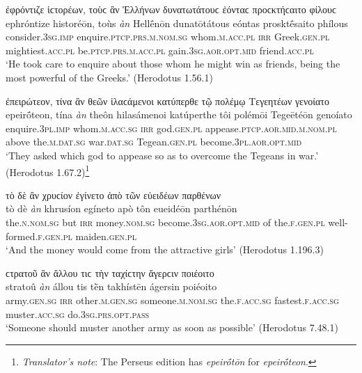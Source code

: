 \begin{exe}
\ex ἐφρόντιζε ἱϲτορέων, τοὺϲ ἂν Ἑλλήνων δυνατωτάτουϲ ἐόνταϲ προϲκτήϲαιτο φίλουϲ\\
\gll ephróntize historéōn, toùs \emph{àn} Hellḗnōn dunatōtátous eóntas prosktḗsaito phílous\\
consider.\textsc{3sg.imp} enquire.\textsc{ptcp.prs.m.nom.sg} whom.\textsc{m.acc.pl} \textsc{irr} Greek.\textsc{gen.pl} mightiest.\textsc{acc.pl} be.\textsc{ptcp.prs.m.acc.pl} gain.\textsc{3sg.aor.opt.mid} friend.\textsc{acc.pl}\\
\trans `He took care to enquire about those whom he might win as friends, being the most powerful of the Greeks.' (Herodotus 1.56.1)
\label{wordgroup9}
\end{exe}

\begin{exe}
\ex ἐπειρώτεον, τίνα ἂν θεῶν ἱλαϲάμενοι κατύπερθε τῷ πολέμῳ Τεγεητέων γενοίατο\\
\gll epeirṓteon, tína \emph{àn} theôn hilasámenoi katúperthe tôi polémōi Tegeētéōn genoíato\\
enquire.\textsc{3pl.imp} whom.\textsc{m.acc.sg} \textsc{irr} god.\textsc{gen.pl} appease.\textsc{ptcp.aor.mid.m.nom.pl} above the.\textsc{m.dat.sg} war.\textsc{dat.sg} Tegean.\textsc{gen.pl} become.\textsc{3pl.aor.opt.mid}\\
\trans `They asked which god to appease so as to overcome the Tegeans in war.' (Herodotus 1.67.2)\footnote{\emph{Translator's note}: The Perseus edition has \textit{epeirṓtōn} for \textit{epeirṓteon}.}
\label{wordgroup10}
\end{exe}

\begin{exe}
\ex τὸ δὲ ἂν χρυϲίον ἐγίνετο ἀπὸ τῶν εὐειδέων παρθένων\\
\gll tò dè \emph{àn} khrusíon egíneto apò tôn eueidéōn parthénōn\\
the.\textsc{n.nom.sg} but \textsc{irr} money.\textsc{nom.sg} become.\textsc{3sg.aor.opt.mid} of the.\textsc{f.gen.pl} well-formed.\textsc{f.gen.pl} maiden.\textsc{gen.pl}\\
\trans `And the money would come from the attractive girls' (Herodotus 1.196.3)
\label{wordgroup11}
\end{exe}

\begin{exe}
\ex ϲτρατοῦ ἂν ἄλλου τιϲ τὴν ταχίϲτην ἄγερϲιν ποιέοιτο\\
\gll stratoû \emph{àn} állou tis tḕn takhístēn ágersin poiéoito\\
army.\textsc{gen.sg} \textsc{irr} other.\textsc{m.gen.sg} someone.\textsc{m.nom.sg} the.\textsc{f.acc.sg} fastest.\textsc{f.acc.sg} muster.\textsc{acc.sg} do.\textsc{3sg.prs.opt.pass}\\
\trans `Someone should muster another army as soon as possible' (Herodotus 7.48.1)
\label{wordgroup12}
\end{exe}


